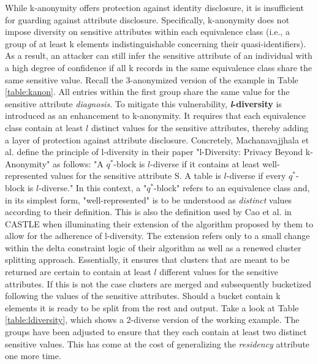 While k-anonymity offers protection against identity disclosure, it is insufficient for guarding against attribute disclosure. Specifically, k-anonymity does not impose diversity on sensitive attributes within each equivalence class (i.e., a group of at least k elements indistinguishable concerning their quasi-identifiers). As a result, an attacker can still infer the sensitive attribute of an individual with a high degree of confidence if all k records in the same equivalence class share the same sensitive value. Recall the 3-anonymized version of the example in Table \ref{table:kanon}. All entries within the first group share the same value for the sensitive attribute \textit{diagnosis}. To mitigate this vulnerability, \mbox{\textbf{\textit{l}-diversity}} is introduced as an enhancement to k-anonymity. It requires that each equivalence class contain at least $l$ distinct values for the sensitive attributes, thereby adding a layer of protection against attribute disclosure. Concretely, Machanavajjhala et al. define the principle of l-diversity in their paper "l-Diversity: Privacy Beyond k-Anonymity" \cite{machanavajjhala2007ldiversity} as follows: "A $q^*$-block is $l$-diverse if it contains at least  well-represented values for the sensitive attribute S. A table is $l$-diverse if every $q^*$-block is $l$-diverse." In this context, a "$q^*$-block" refers to an equivalence class and, in its simplest form, "well-represented" is to be understood as \textit{distinct} values according to their definition. This is also the definition used by Cao et al. in CASTLE when illuminating their extension of the algorithm proposed by them to allow for the adherence of l-diversity. The extension refers only to a small change within the delta constraint logic of their algorithm as well as a renewed cluster splitting approach. Essentially, it ensures that clusters that are meant to be returned are certain to contain at least $l$ different values for the sensitive attributes. If this is not the case clusters are merged and subsequently bucketized following the values of the sensitive attributes. Should a bucket contain k elements it is ready to be split from the rest and output. Take a look at Table \ref{table:ldiversity}, which shows a 2-diverse version of the working example. The groups have been adjusted to ensure that they each contain at least two distinct sensitive values. This has come at the cost of generalizing the \textit{residency} attribute one more time. 

